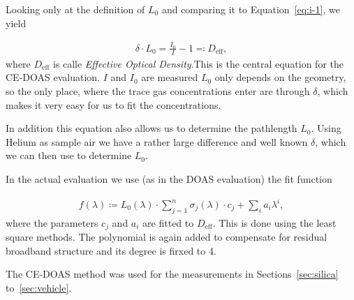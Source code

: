 Looking only at the definition of $L_0$ and comparing it to
Equation~\eqref{eq:i-1}, we yield

\begin{align}
  \delta \cdot L_0 = \frac{I_0}{I} - 1 \eqqcolon D_{\text{eff}}, \label{eq:ce-central}
\end{align}
where $D_{\text{eff}}$ is calle \emph{Effective Optical Density}.This
is the central equation for the CE-DOAS evaluation. $I$ and $I_0$ are
measured $L_0$ only depends on the geometry, so the only place, where
the trace gas concentrations enter are through $\delta$, which makes
it very easy for us to fit the concentrations.

In addition this equation also allows us to determine the pathlength
$L_0$. Using Helium as sample air we have a rather large difference
and well known $\delta$, which we can then use to determine
$L_0$.

In the actual evaluation we use (as in the DOAS evaluation) the fit function

\begin{align*}
  f(\lambda) \coloneqq L_0(\lambda)\cdot\sum_{j=1}^n \sigma_j(\lambda)
  \cdot c_j + \sum_i a_i \lambda^i,
\end{align*}
where the parameters $c_j$ and $a_i$ are fitted to
$D_{\text{eff}}$. This is done using the least square methods. The
polynomial is again added to compensate for residual broadband
structure and its degree is firxed to \num{4}.

The CE-DOAS method was used for the measurements in
Sections~\ref{sec:silica} to~\ref{sec:vehicle}. 

